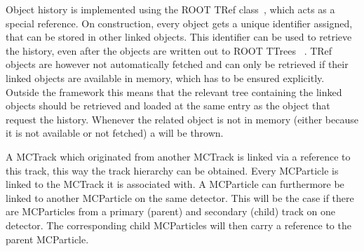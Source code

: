 Object history is implemented using the ROOT TRef class~\cite{roottref}, which acts as a special reference.
On construction, every object gets a unique identifier assigned, that can be stored in other linked objects.
This identifier can be used to retrieve the history, even after the objects are written out to ROOT TTrees ~\cite{roottree}.
TRef objects are however not automatically fetched and can only be retrieved if their linked objects are available in memory, which has to be ensured explicitly.
Outside the framework this means that the relevant tree containing the linked objects should be retrieved and loaded at the same entry as the object that request the history.
Whenever the related object is not in memory (either because it is not available or not fetched) a  will be thrown.

A MCTrack which originated from another MCTrack is linked via a reference to this track, this way the track hierarchy can be obtained.
Every MCParticle is linked to the MCTrack it is associated with.
A MCParticle can furthermore be linked to another MCParticle on the same detector.
This will be the case if there are MCParticles from a primary (parent) and secondary (child) track on one detector. 
The corresponding child MCParticles will then carry a reference to the parent MCParticle.

